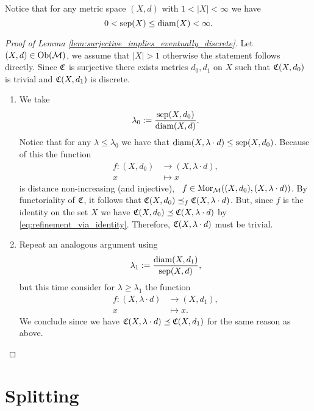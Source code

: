 Notice that for any metric space $(X,d)$ with $1 < |X| < \infty$ we have
$$
0 < \mathrm{sep}(X) \leq \mathrm{diam}(X) < \infty.
$$

\begin{proof}[Proof of Lemma \ref{lem:surjective_implies_eventually_discrete}]
    Let $(X,d) \in \mathrm {Ob}(\mathcal{M})$, we assume that $|X| > 1$ otherwise the statement follows directly. Since $\mathfrak{C}$ is surjective there exists metrics $d_0, d_1$ on $X$ such that $\mathfrak{C}(X,d_0)$ is trivial and $\mathfrak{C}(X,d_1)$ is discrete.

    \begin{enumerate}
        \item We take
        $$
        \lambda_0 := \frac{\mathrm{sep}(X,d_0)}{\mathrm{diam}(X,d)}.
        $$ 
        Notice that for any $\lambda \le \lambda_0$ we have that $\mathrm{diam}(X,\lambda \cdot d) \le \mathrm{sep}(X,d_0)$. Because of this the function
        \begin{align*}
            f: (X, d_0) &\longrightarrow (X, \lambda \cdot d),\\
            x &\longmapsto x
        \end{align*}
        is distance non-increasing (and injective), \ie\ $f \in \mathrm {Mor}_{\mathcal{M}}((X,d_0), (X,\lambda \cdot d))$.
        By functoriality of $\mathfrak{C}$, it follows that $\mathfrak{C}(X,d_0) \preceq_f \mathfrak{C}(X,\lambda \cdot d)$. But, since $f$ is the identity on the set $X$ we have $\mathfrak{C}(X,d_0) \preceq \mathfrak{C}(X,\lambda \cdot d)$ by \eqref{eq:refinement_via_identity}. Therefore, $\mathfrak{C}(X,\lambda \cdot d)$ must be trivial.

        \item Repeat an analogous argument using
        $$
        \lambda_1 := \frac{\mathrm{diam}(X,d_1)}{\mathrm{sep}(X,d)},
        $$
        but this time consider for $\lambda \ge \lambda_1$ the function
        \begin{align*}
            f: (X, \lambda \cdot d) &\longrightarrow (X, d_1),\\
            x &\longmapsto x.
        \end{align*}
        We conclude since we have $\mathfrak{C}(X,\lambda \cdot d) \preceq \mathfrak{C}(X,d_1)$ for the same reason as above. 
        
    \end{enumerate}
\end{proof}

\section{Splitting}

